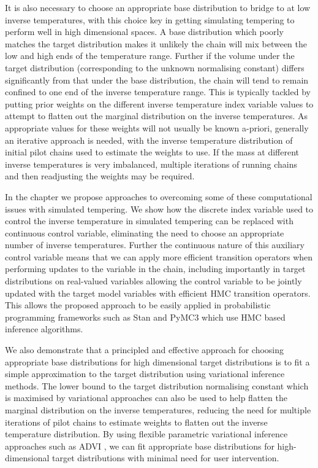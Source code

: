 It is also necessary to choose an appropriate base distribution to bridge to at low inverse temperatures, with this choice key in getting simulating tempering to perform well in high dimensional spaces. A base distribution which poorly matches the target distribution makes it unlikely the chain will mix between the low and high ends of the temperature range. Further if the volume under the target distribution (corresponding to the unknown normalising constant) differs significantly from that under the base distribution, the chain will tend to remain confined to one end of the inverse temperature range. This is typically tackled by putting prior weights on the different inverse temperature index variable values to attempt to flatten out the marginal distribution on the inverse temperatures. As appropriate values for these weights will not usually be known a-priori, generally an iterative approach is needed, with the inverse temperature distribution of initial pilot chains used to estimate the weights to use. If the mass at different inverse temperatures is very imbalanced, multiple iterations of running chains and then readjusting the weights may be required.

In the chapter we propose approaches to overcoming some of these computational issues with simulated tempering. We show how the discrete index variable used to control the inverse temperature in simulated tempering can be replaced with continuous control variable, eliminating the need to choose an appropriate number of inverse temperatures. Further the continuous nature of this auxiliary control variable means that we can apply more efficient transition operators when performing updates to the variable in the chain, including importantly in target distributions on real-valued variables allowing the control variable to be jointly updated with the target model variables with efficient \ac{HMC} transition operators. This allows the proposed approach to be easily applied in probabilistic programming frameworks such as Stan \citep{carpenter2016stan} and PyMC3 \citep{salvatier2016probabilistic} which use \ac{HMC} based inference algorithms.

We also demonstrate that a principled and effective approach for choosing appropriate base distributions for high dimensional target distributions is to fit a simple approximation to the target distribution using variational inference methods. The lower bound to the target distribution normalising constant which is maximised by variational approaches can also be used to help flatten the marginal distribution on the inverse temperatures, reducing the need for multiple iterations of pilot chains to estimate weights to flatten out the inverse temperature distribution. By using flexible parametric variational inference approaches such as \ac{ADVI} \citep{kucukelbir2016automatic}, we can fit appropriate base distributions for high-dimensional target distributions with minimal need for user intervention.


